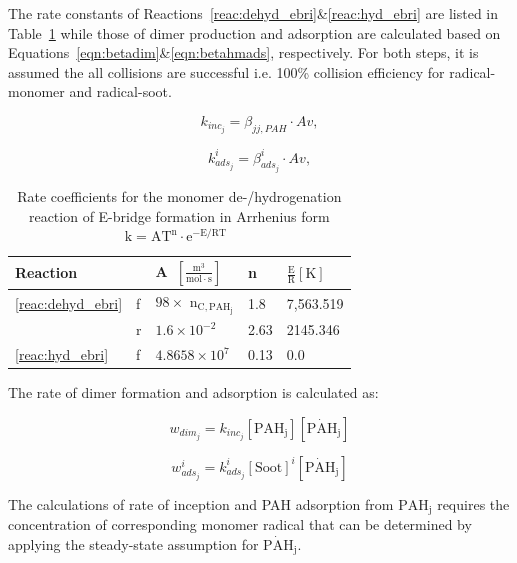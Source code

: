 The rate constants of Reactions~\eqref{reac:dehyd_ebri}\&\eqref{reac:hyd_ebri} are listed in Table~\ref{tab:Ebridge} while those of dimer production and adsorption are calculated based on Equations~\eqref{eqn:betadim}\&\eqref{eqn:betahmads}, respectively. For both steps, it is assumed the all collisions are successful i.e. 100\% collision efficiency for radical-monomer and radical-soot.

\begin{equation}
	k_{inc_j}=
	\beta_{jj,PAH}\cdot Av
	\label{eqn:kdim_ebri},
\end{equation}

\begin{equation}
	k^i_{ads_{j}}=
	\beta^i_{ads_j}\cdot Av
	\label{eqn:kads_ebir},
\end{equation}

\begin{table}
	\caption{Rate coefficients for the monomer de-/hydrogenation reaction of E-bridge formation in Arrhenius form $\mathrm{k=AT^n\cdot e^{-E/RT}}$~\citep{frenklach2020mechanism}}
	\label{tab:Ebridge}
	\centering
	\begin{tabular}{l l l l l}
		\hline
		Reaction & \hspace{0.1cm} & A~$\mathrm{\left[ \frac{m^3}{mol\cdot s} \right]}$ & n & $\mathrm{\frac{E}{R} [K]}$  \\
		\hline
		\eqref{reac:dehyd_ebri} & f & $98\times$ $\mathrm{n_{C, PAH_j}}$ & 1.8 & 7,563.519 \\
		  & r & $1.6\times 10^{-2}$ & 2.63 & 2145.346\\
		\eqref{reac:hyd_ebri} & f & $4.8658\times10^7
		$ & 0.13 & 0.0\\
		\hline
	\end{tabular}
\end{table}

The rate of dimer formation and adsorption is calculated as:

\begin{equation}
	w_{dim_j} = k_{inc_{j}} [\mathrm{PAH_j}] [\mathrm{\dot{PAH}_j}]
	\label{eqn:wdim_ebri}
\end{equation}

\begin{equation}
	w^i_{ads_j} = k^i_{ads_{j}} [\mathrm{Soot}]^i [\mathrm{\dot{PAH}_j}]
\end{equation}

The calculations of rate of inception and PAH adsorption from $\mathrm{PAH_j}$ requires the concentration of corresponding monomer radical that can be determined by applying the steady-state assumption for $\mathrm{\dot{PAH}_j}$.

